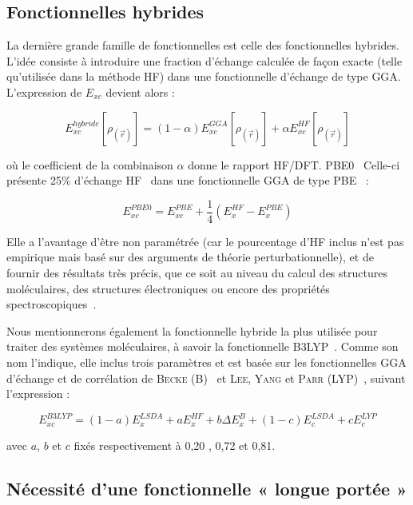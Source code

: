 \subsection{Fonctionnelles hybrides}

La dernière grande famille de fonctionnelles est celle des fonctionnelles hybrides. L’idée consiste à introduire une fraction d’échange calculée de façon exacte (telle qu’utilisée dans la méthode HF) dans une fonctionnelle d’échange de type GGA. L’expression de $E_{xc}$ devient alors :

\begin{equation}
E_{xc}^{hybride}[\rho_{(\vec{r})}] = (1- \alpha) E_{xc}^{GGA}[\rho_{(\vec{r})}] + \alpha E_{xc}^{HF}[\rho_{(\vec{r})}]
\end{equation}

\noindent où le coefficient de la combinaison $\alpha$ donne le rapport HF/DFT.
PBE0~\cite{pbe0} Celle-ci présente 25\% d’échange HF~\cite{methodehf} dans une fonctionnelle GGA de type PBE~\cite{pbe} :

\begin{equation}
E_{xc}^{PBE0} = E_{xc}^{PBE} + \frac{1}{4} (E_{x}^{HF} - E_{x}^{PBE})
\end{equation}

Elle a l’avantage d’être non paramétrée (car le pourcentage d’HF inclus n’est pas empirique mais basé sur des arguments de théorie perturbationnelle), et de fournir des résultats très précis, que ce soit au niveau du calcul des structures moléculaires, des structures électroniques ou encore des propriétés spectroscopiques~\cite{pbe0}.

Nous mentionnerons également la fonctionnelle hybride la plus utilisée pour traiter des systèmes moléculaires, à savoir la fonctionnelle B3LYP~\cite{Bcxthermo}. Comme son nom l’indique, elle inclus trois paramètres et est basée sur les fonctionnelles GGA d’échange et de corrélation de \textsc{Becke} (B)~\cite{B88} et \textsc{Lee}, \textsc{Yang} et \textsc{Parr} (LYP)~\cite{lyp}, suivant l’expression :

\begin{equation}
E_{xc}^{B3LYP} = (1-a) E_{x}^{LSDA} + a E_{x}^{HF} + b \Delta E_{x}^{B} + (1-c) E_{c}^{LSDA} + c E_{c}^{LYP}
\label{B3LYP}
\end{equation}

\noindent avec $a$, $b$ et $c$ fixés respectivement à 0,20 , 0,72 et 0,81.


\subsection{Nécessité d'une fonctionnelle « longue portée »}

